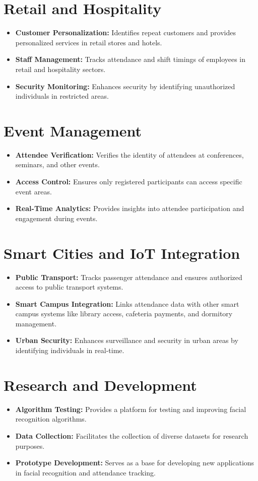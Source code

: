 \documentclass[openany]{report}
\begin{document}
\section{Retail and Hospitality}
\begin{itemize}
    \item \textbf{Customer Personalization:} Identifies repeat customers and provides personalized services in retail stores and hotels.
    \item \textbf{Staff Management:} Tracks attendance and shift timings of employees in retail and hospitality sectors.
    \item \textbf{Security Monitoring:} Enhances security by identifying unauthorized individuals in restricted areas.
\end{itemize}

\section{Event Management}
\begin{itemize}
    \item \textbf{Attendee Verification:} Verifies the identity of attendees at conferences, seminars, and other events.
    \item \textbf{Access Control:} Ensures only registered participants can access specific event areas.
    \item \textbf{Real-Time Analytics:} Provides insights into attendee participation and engagement during events.
\end{itemize}

\section{Smart Cities and IoT Integration}
\begin{itemize}
    \item \textbf{Public Transport:} Tracks passenger attendance and ensures authorized access to public transport systems.
    \item \textbf{Smart Campus Integration:} Links attendance data with other smart campus systems like library access, cafeteria payments, and dormitory management.
    \item \textbf{Urban Security:} Enhances surveillance and security in urban areas by identifying individuals in real-time.
\end{itemize}

\section{Research and Development}
\begin{itemize}
    \item \textbf{Algorithm Testing:} Provides a platform for testing and improving facial recognition algorithms.
    \item \textbf{Data Collection:} Facilitates the collection of diverse datasets for research purposes.
    \item \textbf{Prototype Development:} Serves as a base for developing new applications in facial recognition and attendance tracking.
\end{itemize}
\end{document}
